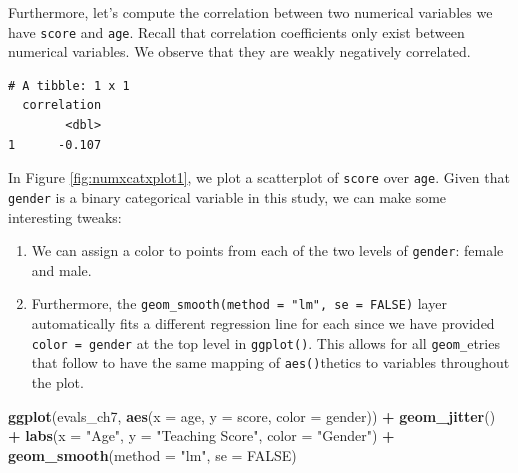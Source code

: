\documentclass[12pt,]{krantz}
\makeatletter
\newenvironment{Shaded}{\begin{snugshade}}{\end{snugshade}}
\newcommand{\KeywordTok}[1]{\textcolor[rgb]{0.27,0.27,0.27}{\textbf{#1}}}
\newcommand{\DataTypeTok}[1]{\textcolor[rgb]{0.27,0.27,0.27}{#1}}
\newcommand{\StringTok}[1]{\textcolor[rgb]{0.5,0.5,0.5}{#1}}
\newcommand{\OtherTok}[1]{\textcolor[rgb]{0.37,0.37,0.37}{#1}}
\newcommand{\OperatorTok}[1]{\textcolor[rgb]{0.43,0.43,0.43}{\textbf{#1}}}
\newcommand{\NormalTok}[1]{#1}
\providecommand{\tightlist}{%
  \setlength{\itemsep}{0pt}\setlength{\parskip}{0pt}}
\newenvironment{kframe}{%
\medskip{}
\setlength{\fboxsep}{.8em}
 \def\at@end@of@kframe{}%
 \ifinner\ifhmode%
  \def\at@end@of@kframe{\end{minipage}}%
  \begin{minipage}{\columnwidth}%
 \fi\fi%
 \def\FrameCommand##1{\hskip\@totalleftmargin \hskip-\fboxsep
 \colorbox{shadecolor}{##1}\hskip-\fboxsep
     \hskip-\linewidth \hskip-\@totalleftmargin \hskip\columnwidth}%
 \MakeFramed {\advance\hsize-\width
   \@totalleftmargin\z@ \linewidth\hsize
   \@setminipage}}%
 {\par\unskip\endMakeFramed%
 \at@end@of@kframe}
\renewenvironment{Shaded}{\begin{kframe}}{\end{kframe}}
\makeatother
\begin{document}
Furthermore, let's compute the correlation between two numerical
variables we have \texttt{score} and \texttt{age}. Recall that
correlation coefficients only exist between numerical variables. We
observe that they are weakly negatively correlated.

\begin{Shaded}
\end{Shaded}

\begin{verbatim}
# A tibble: 1 x 1
  correlation
        <dbl>
1      -0.107
\end{verbatim}

In Figure \ref{fig:numxcatxplot1}, we plot a scatterplot of
\texttt{score} over \texttt{age}. Given that \texttt{gender} is a binary
categorical variable in this study, we can make some interesting tweaks:

\begin{enumerate}
\def\labelenumi{\arabic{enumi}.}
\tightlist
\item
  We can assign a color to points from each of the two levels of
  \texttt{gender}: female and male.
\item
  Furthermore, the \texttt{geom\_smooth(method\ =\ "lm",\ se\ =\ FALSE)}
  layer automatically fits a different regression line for each since we
  have provided \texttt{color\ =\ gender} at the top level in
  \texttt{ggplot()}. This allows for all \texttt{geom\_}etries that
  follow to have the same mapping of \texttt{aes()}thetics to variables
  throughout the plot.
\end{enumerate}

\begin{Shaded}
\begin{Highlighting}[]
\KeywordTok{ggplot}\NormalTok{(evals_ch7, }\KeywordTok{aes}\NormalTok{(}\DataTypeTok{x =}\NormalTok{ age, }\DataTypeTok{y =}\NormalTok{ score, }\DataTypeTok{color =}\NormalTok{ gender)) }\OperatorTok{+}
\StringTok{  }\KeywordTok{geom_jitter}\NormalTok{() }\OperatorTok{+}
\StringTok{  }\KeywordTok{labs}\NormalTok{(}\DataTypeTok{x =} \StringTok{"Age"}\NormalTok{, }\DataTypeTok{y =} \StringTok{"Teaching Score"}\NormalTok{, }\DataTypeTok{color =} \StringTok{"Gender"}\NormalTok{) }\OperatorTok{+}
\StringTok{  }\KeywordTok{geom_smooth}\NormalTok{(}\DataTypeTok{method =} \StringTok{"lm"}\NormalTok{, }\DataTypeTok{se =} \OtherTok{FALSE}\NormalTok{)}
\end{Highlighting}
\end{Shaded}
\end{document}
